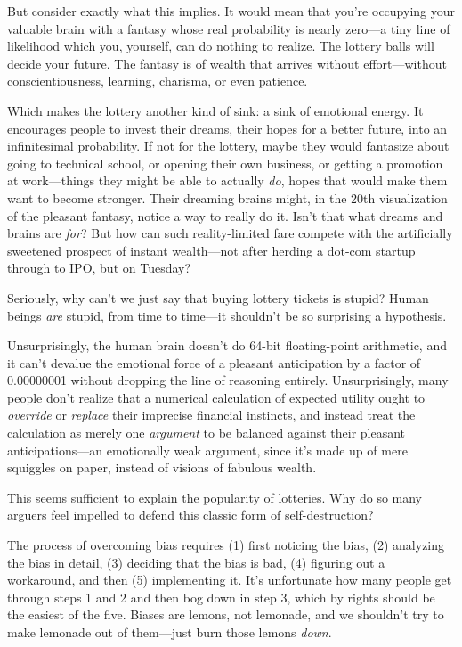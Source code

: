 {
 But consider exactly what this implies. It would mean that
you're occupying your valuable brain with a fantasy
whose real probability is nearly zero---a tiny line of likelihood which
you, yourself, can do nothing to realize. The lottery balls will decide
your future. The fantasy is of wealth that arrives without
effort{}---without conscientiousness, learning, charisma, or even
patience.}

{
 Which makes the lottery another kind of sink: a sink of emotional
energy. It encourages people to invest their dreams, their hopes for a
better future, into an infinitesimal probability. If not for the
lottery, maybe they would fantasize about going to technical school, or
opening their own business, or getting a promotion at work---things
they might be able to actually \textit{do}, hopes that would make them
want to become stronger. Their dreaming brains might, in the 20th
visualization of the pleasant fantasy, notice a way to really do it.
Isn't that what dreams and brains are \textit{for}? But
how can such reality-limited fare compete with the artificially
sweetened prospect of instant wealth---not after herding a dot-com
startup through to IPO, but on Tuesday?}

{
 Seriously, why can't we just say that buying
lottery tickets is stupid? Human beings \textit{are} stupid, from time
to time---it shouldn't be so surprising a hypothesis.}

{
 Unsurprisingly, the human brain doesn't do 64-bit
floating-point arithmetic, and it can't devalue the
emotional force of a pleasant anticipation by a factor of 0.00000001
without dropping the line of reasoning entirely. Unsurprisingly, many
people don't realize that a numerical calculation of
expected utility ought to \textit{override} or \textit{replace} their
imprecise financial instincts, and instead treat the calculation as
merely one \textit{argument} to be balanced against their pleasant
anticipations---an emotionally weak argument, since
it's made up of mere squiggles on paper, instead of
visions of fabulous wealth.}

{
 This seems sufficient to explain the popularity of lotteries. Why
do so many arguers feel impelled to defend this classic form of
self-destruction?}

{
 The process of overcoming bias requires (1) first noticing the
bias, (2) analyzing the bias in detail, (3) deciding that the bias is
bad, (4) figuring out a workaround, and then (5) implementing it.
It's unfortunate how many people get through steps 1
and 2 and then bog down in step 3, which by rights should be the
easiest of the five. Biases are lemons, not lemonade, and we
shouldn't try to make lemonade out of them---just burn
those lemons \textit{down}.}

